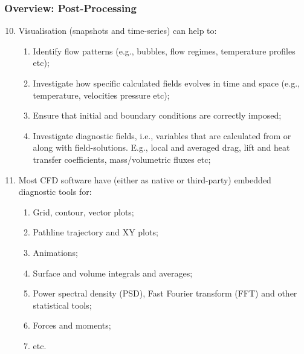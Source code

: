 \documentclass[10pt,compress]{beamer}
\begin{document}
\begin{frame}
 \frametitle{Overview: Post-Processing} 
\begin{enumerate}
  \setcounter{enumi}{9}
  \item <1-> Visualisation (snapshots and time-series) can help to:
      \begin{enumerate}
         \item <2-> Identify flow patterns (e.g., bubbles, flow regimes, temperature profiles etc);
         \item <3-> Investigate how specific calculated fields evolves in time and space (e.g., temperature, velocities pressure etc);
         \item <4-> Ensure that initial and boundary conditions are correctly imposed;
         \item <5-> Investigate diagnostic fields, i.e., variables that are calculated from or along with field-solutions. E.g., local and averaged drag, lift and heat transfer coefficients, mass/volumetric fluxes etc;
      \end{enumerate}
  \item <6-> Most CFD software have (either as native or third-party) embedded diagnostic tools for:
      \begin{enumerate}
         \item <7-> Grid, contour, vector plots;
         \item <8-> Pathline trajectory and XY plots;
         \item <9-> Animations;
         \item <10-> Surface and volume integrals and averages;
         \item <11-> Power spectral density (PSD), Fast Fourier transform (FFT) and other statistical tools;
         \item <12-> Forces and moments;
         \item <13-> etc.
      \end{enumerate}

\end{enumerate}

\end{frame}
 
\end{document}
